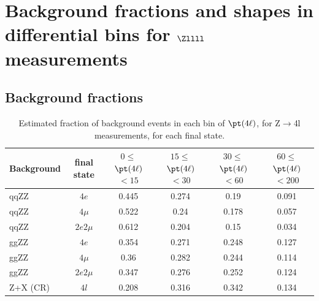 \section{Background fractions and shapes in differential bins for \texorpdfstring{$\Zllll$}{Z to 4l} measurements}

\subsection{Background fractions} \label{app:z4l_bkginputs_fractions}

\begin{table}[!h!tb]  
\begin{center}  
\small  
    \caption{  
        Estimated fraction of background events in each bin of $\pt(4\ell)$, for Z$\to$4l measurements, for each final state.  
\label{tab:z4l_fractions_pT4l}  
}  
\begin{tabular}{|l|c|c|c|c|c|}  
\hline  
Background & final state & $0\leq$$\pt(4\ell)$$<15$ & $15\leq$$\pt(4\ell)$$<30$ & $30\leq$$\pt(4\ell)$$<60$ & $60\leq$$\pt(4\ell)$$<200$ \\ \hline 
qqZZ& $4e$  & 0.445 & 0.274 & 0.19 & 0.091  \\
qqZZ& $4\mu$  & 0.522 & 0.24 & 0.178 & 0.057  \\
qqZZ& $2e2\mu$  & 0.612 & 0.204 & 0.15 & 0.034  \\
ggZZ& $4e$  & 0.354 & 0.271 & 0.248 & 0.127  \\
ggZZ& $4\mu$  & 0.36 & 0.282 & 0.244 & 0.114  \\
ggZZ& $2e2\mu$  & 0.347 & 0.276 & 0.252 & 0.124  \\
Z+X (CR)& $4l$  & 0.208 & 0.316 & 0.342 & 0.134  \\
\hline  
\end{tabular}  
\normalsize  
\end{center}  
\end{table}  

